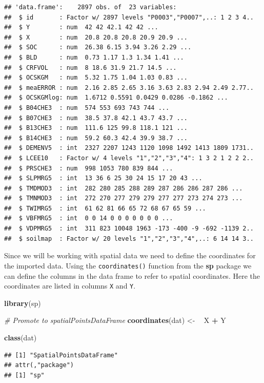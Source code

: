 \documentclass[10pt,b5paper,]{book}
\newenvironment{Shaded}{\begin{snugshade}}{\end{snugshade}}
\newcommand{\CommentTok}[1]{\textcolor[rgb]{0.56,0.35,0.01}{\textit{#1}}}
\newcommand{\ErrorTok}[1]{\textcolor[rgb]{0.64,0.00,0.00}{\textbf{#1}}}
\newcommand{\KeywordTok}[1]{\textcolor[rgb]{0.13,0.29,0.53}{\textbf{#1}}}
\newcommand{\NormalTok}[1]{#1}
\newcommand{\OperatorTok}[1]{\textcolor[rgb]{0.81,0.36,0.00}{\textbf{#1}}}
\newcommand{\StringTok}[1]{\textcolor[rgb]{0.31,0.60,0.02}{#1}}
\theoremstyle{definition}
\theoremstyle{definition}
\theoremstyle{definition}
\theoremstyle{remark}
\begin{document}
\begin{verbatim}
## 'data.frame':    2897 obs. of  23 variables:
##  $ id       : Factor w/ 2897 levels "P0003","P0007",..: 1 2 3 4..
##  $ Y        : num  42 42 42.1 42 42 ...
##  $ X        : num  20.8 20.8 20.8 20.9 20.9 ...
##  $ SOC      : num  26.38 6.15 3.94 3.26 2.29 ...
##  $ BLD      : num  0.73 1.17 1.3 1.34 1.41 ...
##  $ CRFVOL   : num  8 18.6 31.9 21.7 14.5 ...
##  $ OCSKGM   : num  5.32 1.75 1.04 1.03 0.83 ...
##  $ meaERROR : num  2.16 2.85 2.65 3.16 3.63 2.83 2.94 2.49 2.77..
##  $ OCSKGMlog: num  1.6712 0.5591 0.0429 0.0286 -0.1862 ...
##  $ B04CHE3  : num  574 553 693 743 744 ...
##  $ B07CHE3  : num  38.5 37.8 42.1 43.7 43.7 ...
##  $ B13CHE3  : num  111.6 125 99.8 118.1 121 ...
##  $ B14CHE3  : num  59.2 60.3 42.4 39.9 38.7 ...
##  $ DEMENV5  : int  2327 2207 1243 1120 1098 1492 1413 1809 1731..
##  $ LCEE10   : Factor w/ 4 levels "1","2","3","4": 1 3 2 1 2 2 2..
##  $ PRSCHE3  : num  998 1053 780 839 844 ...
##  $ SLPMRG5  : int  13 36 6 25 30 24 15 17 20 43 ...
##  $ TMDMOD3  : int  282 280 285 288 289 287 286 286 287 286 ...
##  $ TMNMOD3  : int  272 270 277 279 279 277 277 273 274 273 ...
##  $ TWIMRG5  : int  61 62 81 66 65 72 68 67 65 59 ...
##  $ VBFMRG5  : int  0 0 14 0 0 0 0 0 0 0 ...
##  $ VDPMRG5  : int  311 823 10048 1963 -173 -400 -9 -692 -1139 2..
##  $ soilmap  : Factor w/ 20 levels "1","2","3","4",..: 6 14 14 3..
\end{verbatim}

Since we will be working with spatial data we need to define the
coordinates for the imported data. Using the \texttt{coordinates()}
function from the \textbf{sp} package we can define the columns in the
data frame to refer to spatial coordinates. Here the coordinates are
listed in columns \texttt{X} and \texttt{Y}.

\begin{Shaded}
\begin{Highlighting}[]
\KeywordTok{library}\NormalTok{(sp)}

\CommentTok{# Promote to spatialPointsDataFrame}
\KeywordTok{coordinates}\NormalTok{(dat) <-}\StringTok{ }\ErrorTok{~}\StringTok{ }\NormalTok{X }\OperatorTok{+}\StringTok{ }\NormalTok{Y}

\KeywordTok{class}\NormalTok{(dat)}
\end{Highlighting}
\end{Shaded}

\begin{verbatim}
## [1] "SpatialPointsDataFrame"
## attr(,"package")
## [1] "sp"
\end{verbatim}
\end{document}
